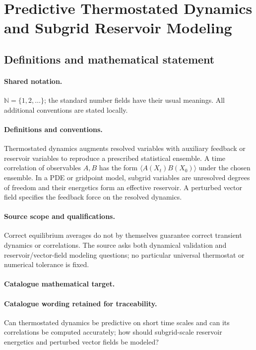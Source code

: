 \documentclass[11pt]{article}
\begin{document}
\section{Predictive Thermostated Dynamics and Subgrid Reservoir Modeling}\label{statement}

\subsection{Definitions and mathematical statement}

\paragraph{Shared notation.}$\mathbb N=\{1,2,\ldots\}$; the standard number fields have their usual meanings. All additional conventions are stated locally.


\paragraph{Definitions and conventions.} Thermostated dynamics augments resolved variables with auxiliary feedback or reservoir variables to reproduce a prescribed statistical ensemble. A time correlation of observables $A,B$ has the form $\langle A(X_t)B(X_0)\rangle$ under the chosen ensemble. In a PDE or gridpoint model, subgrid variables are unresolved degrees of freedom and their energetics form an effective reservoir. A perturbed vector field specifies the feedback force on the resolved dynamics.

\paragraph{Source scope and qualifications.} Correct equilibrium averages do not by themselves guarantee correct transient dynamics or correlations. The source asks both dynamical validation and reservoir/vector-field modeling questions; no particular universal thermostat or numerical tolerance is fixed.

\paragraph{Catalogue mathematical target.}
\paragraph{Catalogue wording retained for traceability.}
Can thermostated dynamics be predictive on short time scales and can its correlations be computed accurately; how should subgrid-scale reservoir energetics and perturbed vector fields be modeled?
\end{document}
